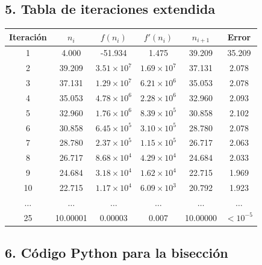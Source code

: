 \documentclass[12pt]{article}
\begin{document}
\subsection*{5. Tabla de iteraciones extendida}
\begin{center}
\begin{tabular}{@{}cccccc@{}}
\toprule
Iteración & $n_i$     & $f(n_i)$      & $f'(n_i)$     & $n_{i+1}$ & Error     \\
\midrule
1  &  4.000   &   -51.934    &   1.475   &   39.209   & 35.209  \\
2  & 39.209   & $3.51\!\times10^7$ & $1.69\!\times10^7$ & 37.131 &  2.078  \\
3  & 37.131   & $1.29\!\times10^7$ & $6.21\!\times10^6$ & 35.053 &  2.078  \\
4  & 35.053   & $4.78\!\times10^6$ & $2.28\!\times10^6$ & 32.960 &  2.093  \\
5  & 32.960   & $1.76\!\times10^6$ & $8.39\!\times10^5$ & 30.858 &  2.102  \\
6  & 30.858   & $6.45\!\times10^5$ & $3.10\!\times10^5$ & 28.780 &  2.078  \\
7  & 28.780   & $2.37\!\times10^5$ & $1.15\!\times10^5$ & 26.717 &  2.063  \\
8  & 26.717   & $8.68\!\times10^4$ & $4.29\!\times10^4$ & 24.684 &  2.033  \\
9  & 24.684   & $3.18\!\times10^4$ & $1.62\!\times10^4$ & 22.715 &  1.969  \\
10 & 22.715   & $1.17\!\times10^4$ & $6.09\!\times10^3$ & 20.792 &  1.923  \\
\(\dots\) & \(\dots\) & \(\dots\) & \(\dots\) & \(\dots\) & \(\dots\) \\
25 & 10.00001 & 0.00003       & 0.007     & 10.00000 & $<10^{-5}$ \\
\bottomrule
\end{tabular}
\end{center}

\subsection*{6. Código Python para la bisección}
\end{document}
